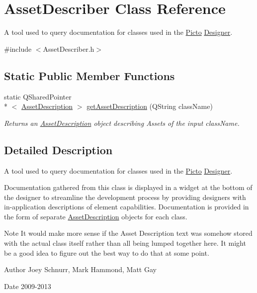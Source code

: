 \hypertarget{class_asset_describer}{\section{Asset\-Describer Class Reference}
\label{class_asset_describer}
}


A tool used to query documentation for classes used in the \hyperlink{namespace_picto}{Picto} \hyperlink{class_designer}{Designer}.  




{\ttfamily \#include $<$Asset\-Describer.\-h$>$}

\subsection*{Static Public Member Functions}
\begin{DoxyCompactItemize}
\item 
static Q\-Shared\-Pointer\\*
$<$ \hyperlink{struct_asset_description}{Asset\-Description} $>$ \hyperlink{class_asset_describer_abbb4f0834484d1fc3611f3adf7d97ceb}{get\-Asset\-Description} (Q\-String class\-Name)
\begin{DoxyCompactList}\small\item\em Returns an \hyperlink{struct_asset_description}{Asset\-Description} object describing Assets of the input class\-Name. \end{DoxyCompactList}\end{DoxyCompactItemize}


\subsection{Detailed Description}
A tool used to query documentation for classes used in the \hyperlink{namespace_picto}{Picto} \hyperlink{class_designer}{Designer}. 

Documentation gathered from this class is displayed in a widget at the bottom of the designer to streamline the development process by providing designers with in-\/application descriptions of element capabilities. Documentation is provided in the form of separate \hyperlink{struct_asset_description}{Asset\-Description} objects for each class. \begin{DoxyNote}{Note}
It would make more sense if the Asset Description text was somehow stored with the actual class itself rather than all being lumped together here. It might be a good idea to figure out the best way to do that at some point. 
\end{DoxyNote}
\begin{DoxyAuthor}{Author}
Joey Schnurr, Mark Hammond, Matt Gay 
\end{DoxyAuthor}
\begin{DoxyDate}{Date}
2009-\/2013 
\end{DoxyDate}


